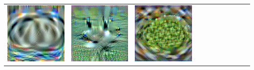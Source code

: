 \documentclass[main.tex]{subfiles}
\begin{document}
{\begin{center}
\begin{tabular}{ccccccccccc}
    \includegraphics[align=c,width=\coverwidth\linewidth]{figures/cover/tiny/0_guinea_pig_0.pdf} &
    \includegraphics[align=c,width=\coverwidth\linewidth]{figures/cover/tiny/goose_0.pdf} &
    \includegraphics[align=c,width=\coverwidth\linewidth]{figures/cover/tiny/guacamole_0.pdf} &

\end{tabular}
\end{center}}
\end{document}
